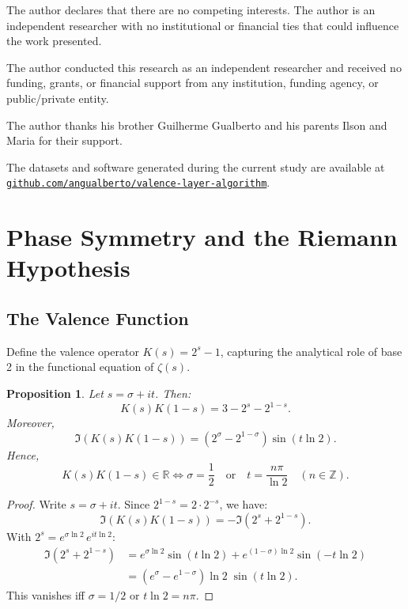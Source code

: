 \documentclass{sbc2023-pdf}%
\theoremstyle{plain}
\newtheorem{proposition}[theorem]{Proposition}
\begin{document}
\begin{interests}
The author declares that there are no competing interests. The author is an independent researcher with no institutional or financial ties that could influence the work presented.
\end{interests}

\begin{funding}
The author conducted this research as an independent researcher and received no funding, grants, or financial support from any institution, funding agency, or public/private entity.
\end{funding}

\begin{acknowledgements}
The author thanks his brother Guilherme Gualberto and his parents Ilson and Maria for their support.
\end{acknowledgements}

\begin{materials}
\raggedright
The datasets and software generated during the current study are available at \href{https://github.com/angualberto/The-Valence-Layer-Algorithm-A-Structured-Approach-to-Consecutive-Primes}{\texttt{github.com/angualberto/valence-layer-algorithm}}.
\end{materials}
\appendix
\renewcommand{\thesubsection}{\thesection.\arabic{subsection}}
\section{Phase Symmetry and the Riemann Hypothesis}
\label{ap:phase}

\subsection{The Valence Function}\label{ap:sec:valence}

Define the valence operator \(K(s) = 2^s - 1\), capturing the analytical role of base 2 in the functional equation of \(\zeta(s)\).

\begin{proposition}
\label{prop:symmetry}
Let \(s = \sigma + it\). Then:
\[
K(s)K(1-s) = 3 - 2^s - 2^{1-s}.
\]
Moreover,
\[
\Im(K(s)K(1-s)) = (2^\sigma - 2^{1-\sigma}) \sin(t \ln 2).
\]
Hence,
\[
K(s)K(1-s) \in \mathbb{R} \iff \sigma = \frac{1}{2} \quad \text{or} \quad t = \frac{n\pi}{\ln 2} \quad (n \in \mathbb{Z}).
\]
\end{proposition}
\begin{proof}
Write \(s=\sigma+it\). Since \(2^{1-s}=2\cdot2^{-s}\), we have:
\[
\Im(K(s)K(1-s)) = -\Im(2^s + 2^{1-s}).
\]
With \(2^s = e^{\sigma\ln2}\,e^{it\ln2}\):
\[
\begin{aligned}
\Im(2^s + 2^{1-s})
&= e^{\sigma\ln2}\sin(t\ln2) + e^{(1-\sigma)\ln2}\sin(-t\ln2)\\
&= (e^{\sigma} - e^{1-\sigma})\ln2\;\sin(t\ln2).
\end{aligned}
\]
This vanishes iff \(\sigma=1/2\) or \(t\ln2=n\pi\).
\end{proof}
\end{document}
